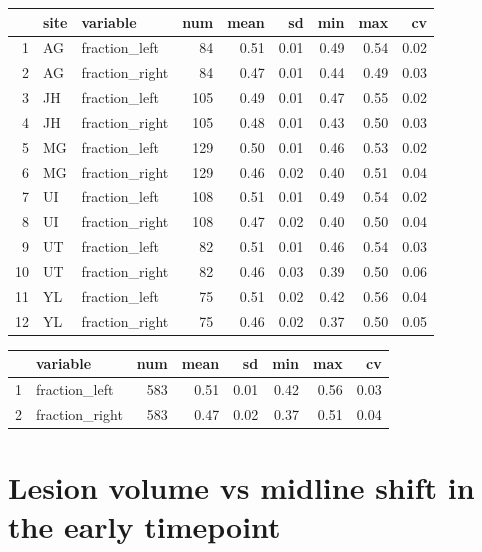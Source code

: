\documentclass[
]{article}
\begin{document}
\begin{table}[ht]
\centering
\begin{tabular}{rllrrrrrr}
  \hline
 & site & variable & num & mean & sd & min & max & cv \\ 
  \hline
1 & AG & fraction\_left &  84 & 0.51 & 0.01 & 0.49 & 0.54 & 0.02 \\ 
  2 & AG & fraction\_right &  84 & 0.47 & 0.01 & 0.44 & 0.49 & 0.03 \\ 
  3 & JH & fraction\_left & 105 & 0.49 & 0.01 & 0.47 & 0.55 & 0.02 \\ 
  4 & JH & fraction\_right & 105 & 0.48 & 0.01 & 0.43 & 0.50 & 0.03 \\ 
  5 & MG & fraction\_left & 129 & 0.50 & 0.01 & 0.46 & 0.53 & 0.02 \\ 
  6 & MG & fraction\_right & 129 & 0.46 & 0.02 & 0.40 & 0.51 & 0.04 \\ 
  7 & UI & fraction\_left & 108 & 0.51 & 0.01 & 0.49 & 0.54 & 0.02 \\ 
  8 & UI & fraction\_right & 108 & 0.47 & 0.02 & 0.40 & 0.50 & 0.04 \\ 
  9 & UT & fraction\_left &  82 & 0.51 & 0.01 & 0.46 & 0.54 & 0.03 \\ 
  10 & UT & fraction\_right &  82 & 0.46 & 0.03 & 0.39 & 0.50 & 0.06 \\ 
  11 & YL & fraction\_left &  75 & 0.51 & 0.02 & 0.42 & 0.56 & 0.04 \\ 
  12 & YL & fraction\_right &  75 & 0.46 & 0.02 & 0.37 & 0.50 & 0.05 \\ 
   \hline
\end{tabular}
\end{table}
\begin{table}[ht]
\centering
\begin{tabular}{rlrrrrrr}
  \hline
 & variable & num & mean & sd & min & max & cv \\ 
  \hline
1 & fraction\_left & 583 & 0.51 & 0.01 & 0.42 & 0.56 & 0.03 \\ 
  2 & fraction\_right & 583 & 0.47 & 0.02 & 0.37 & 0.51 & 0.04 \\ 
   \hline
\end{tabular}
\end{table}

\hypertarget{lesion-volume-vs-midline-shift-in-the-early-timepoint}{%
\section{Lesion volume vs midline shift in the early
timepoint}\label{lesion-volume-vs-midline-shift-in-the-early-timepoint}}
\end{document}
